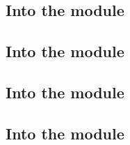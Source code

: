 \subsection{Into the \addMod{}         module}              \label{oob: lookups: add}
\subsection{Into the \modMod{}         module}              \label{oob: lookups: mod}
\subsection{Into the \wcpMod{}         module}              \label{oob: lookups: wcp}
\subsection{Into the \blsRefTableMod{} module}      \label{oob: lookups: blsreftable}
